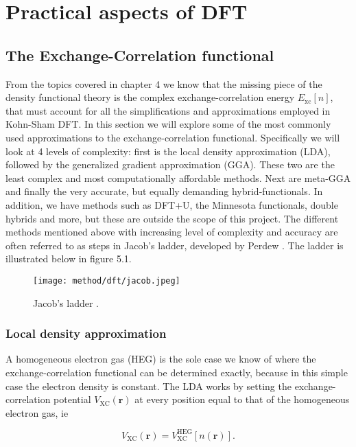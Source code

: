 \chapter{Practical aspects of DFT}
\label{sec:Practical DFT}

\section{The Exchange-Correlation functional}
From the topics covered in chapter 4 we know that the missing piece of the density functional theory is the complex exchange-correlation energy $E_{\text{xc}}[n]$, that must account for all the simplifications and approximations employed in Kohn-Sham DFT. In this section we will explore some of the most commonly used approximations to the exchange-correlation functional. Specifically we will look at 4 levels of complexity: first is the local density approximation (LDA), followed by the generalized gradient approximation (GGA). These two are the least complex and most computationally affordable methods. Next are meta-GGA and finally the very accurate, but equally demanding hybrid-functionals. In addition, we have methods such as DFT+U, the Minnesota functionals, double hybrids and more, but these are outside the scope of this project. The different methods mentioned above with increasing level of complexity and accuracy are often referred to as steps in Jacob's ladder, developed by Perdew \cite{jacob}. The ladder is illustrated below in figure 5.1. 

\begin{figure}[H]
\centering
\texttt{[image: method/dft/jacob.jpeg]}
\caption{Jacob's ladder \cite{jacob}.}
\end{figure}

   

\subsection{Local density approximation}
A homogeneous electron gas (HEG) is the sole case we know of where the exchange-correlation functional can be determined exactly, because in this simple case the electron density is constant. The LDA works by setting the exchange-correlation potential $V_\text{XC}(\boldsymbol{r})$ at every position equal to that of the homogeneous electron gas, ie

\begin{equation}
V_\text{XC}(\boldsymbol{r}) = V_\text{XC} ^\text{HEG}[n(\boldsymbol{r})] .
\end{equation} 

